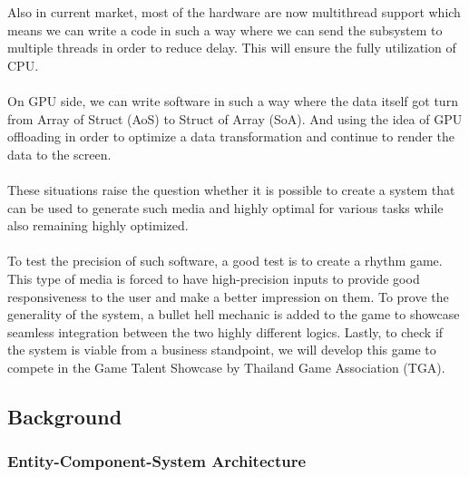 Also in current market, most of the hardware are now multithread support which means we can write a code in such a
way where we can send the subsystem to multiple threads in order to reduce delay.
This will ensure the fully utilization of CPU\@.
\\\\
On GPU side, we can write software in such a way where the data itself got turn from Array of Struct (AoS) to Struct of Array (SoA).
And using the idea of GPU offloading in order to optimize a data transformation and continue to render the data to the screen.
\\\\
These situations raise the question \textemdash whether it is possible to create a system that can be used to generate such media
and highly optimal for various tasks while also remaining highly optimized.
\\\\
To test the precision of such software, a good test is to create a rhythm game.
This type of media is forced to have high-precision inputs to provide good responsiveness to
the user and make a better impression on them.
To prove the generality of the system, a bullet hell mechanic is added to the game to showcase seamless
integration between the two highly different logics.
Lastly, to check if the system is viable from a business standpoint, we will develop this game
to compete in the Game Talent Showcase by Thailand Game Association (TGA).

\subsection{Background}
\label{subsec:background}

\subsubsection*{Entity-Component-System Architecture}

